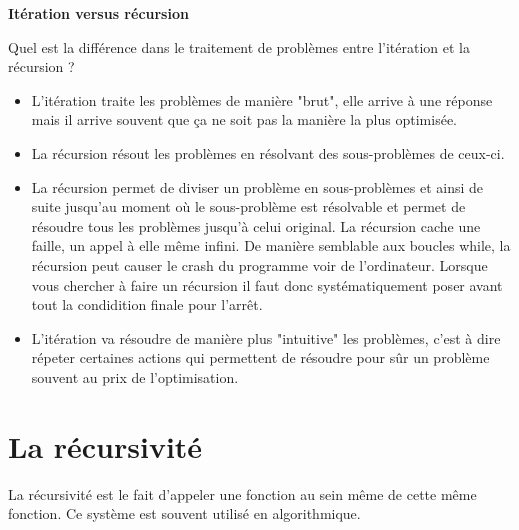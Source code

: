     \begin{Exercice}[5 minutes] \textbf{Itération versus récursion}
      	
      	Quel est la différence dans le traitement de problèmes entre l'itération et la récursion ?
    
        \begin{conseil}
        
           \begin{itemize}
           	\item L'itération traite les problèmes de manière "brut", elle arrive à une réponse mais il arrive souvent que ça ne soit pas la manière la plus optimisée.
           	\item La récursion résout les problèmes en résolvant des sous-problèmes de ceux-ci.
           \end{itemize}
		     
        \end{conseil}
        
        \begin{solution}
        	\begin{itemize}
           	\item La récursion permet de diviser un problème en sous-problèmes et ainsi de suite jusqu'au moment où le sous-problème est résolvable et permet de résoudre tous les problèmes jusqu'à celui original. La récursion cache une faille, un appel à elle même infini. De manière semblable aux boucles while, la récursion peut causer le crash du programme voir de l'ordinateur. Lorsque vous chercher à faire un récursion il faut donc systématiquement poser avant tout la condidition finale pour l'arrêt.
           	\item L'itération va résoudre de manière plus "intuitive" les problèmes, c'est à dire répeter certaines actions qui permettent de résoudre pour sûr un problème souvent au prix de l'optimisation.
           \end{itemize}
            
        \end{solution}
    \end{Exercice}
    
    
    \section{La récursivité}
    
    La récursivité est le fait d'appeler une fonction au sein même de cette même fonction. Ce système est souvent utilisé en algorithmique. \\
    
